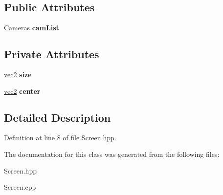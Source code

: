 \subsection*{Public Attributes}
\begin{DoxyCompactItemize}
\item 
\hypertarget{class_screen_ae18e2382eee3c792f94d251ee58b3264}{\hyperlink{class_cameras}{Cameras} {\bfseries cam\-List}}\label{class_screen_ae18e2382eee3c792f94d251ee58b3264}

\end{DoxyCompactItemize}
\subsection*{Private Attributes}
\begin{DoxyCompactItemize}
\item 
\hypertarget{class_screen_a518fc6d0287e8d3cf44a1eb73f3be6e7}{\hyperlink{struct_angel_1_1vec2}{vec2} {\bfseries size}}\label{class_screen_a518fc6d0287e8d3cf44a1eb73f3be6e7}

\item 
\hypertarget{class_screen_a9aaa9c66b706c2186fa024bf139078f3}{\hyperlink{struct_angel_1_1vec2}{vec2} {\bfseries center}}\label{class_screen_a9aaa9c66b706c2186fa024bf139078f3}

\end{DoxyCompactItemize}


\subsection{Detailed Description}


Definition at line 8 of file Screen.\-hpp.



The documentation for this class was generated from the following files\-:\begin{DoxyCompactItemize}
\item 
Screen.\-hpp\item 
Screen.\-cpp\end{DoxyCompactItemize}

